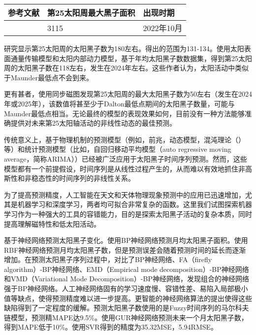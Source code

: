 \begin{table}[!htbp]
\begin{tabular}{lll}
    \hline
    参考文献 & 第25太阳周最大黑子面积 & 出现时期\\
    \hline
    \citep{li2021predicting} &  3115\pm 401 & 2022年10月\\
    \bottomrule
  \end{tabular}
\end{table}

\citet{pesnell2018effects}研究显示第25太阳周的太阳黑子数为180左右。\citet{bisoi2020another}得出的范围为131-134。\citet{bhowmik2018prediction}使用太阳表面通量传输模型和太阳内部动力模型，基于年均太阳黑子数数据集，得到第25太阳周的太阳黑子数在118左右，发生在2024年左右。这些作者认为，太阳活动中类似于Maunder最低点不会到来。

更有甚者，\citep{kitiashvili2020application}使用同步磁图发现第25太阳周的最大太阳黑子数为50左右（发生在2024年或2025年），该数值将甚至少于Dalton最低点期间的太阳黑子数量，可能与Maunder最低点相当。无论最终的模型的表现效果如何，目前没有一种方法能够准确提供对未来第25太阳轴活动的非线性动态的最佳预测。

传统意义上，基于物理机制的预测模型（例如，前兆，动态模型，混沌理论（\citep{jie2012prediction}）等）和统计预测模型（比如，自回归移动平均模型（auto regressive moving average，简称ARIMA））已经被广泛应用于太阳黑子时间序列预测。然而，这些模型都有一个前提假设，时间序列是从线性过程产生的，从而难以有效地抓住非高斯性和非稳态性的时间序列的非线性关系\citep{jiang2011sunspot,arlt2015solar}。

为了提高预测精度，人工智能在天文和天体物理现象预测中的应用已迅速增加\citep{pala2019forecasting,fluke2020surveying}，尤其是机器学习和深度学习，两者均可拟合非常复杂的函数。这里我们试图探索机器学习作为一种强大的工具的容错能力，目的是探索太阳黑子活动的复杂本质，同时提高理解磁特性和低太阳活动。

\citet{ren2014neural}基于神经网络预测太阳黑子变化。\citet{ding2012prediction}使用BP神经网络预测月均太阳黑子面积。\citet{zhao2008prediction}使用RBF神经网络预测月均太阳黑子数，但是预测误差会随着预测时间的延长而逐渐增加。\citet{li2018hybrid}在预测太阳黑子序列过程中，对比了BP神经网络、FA（firefly algorithm）-BP神经网络、EMD（Empirical mode decomposition）-BP神经网络和VMD（Variational Mode Decomposition）-BP神经网络，发现组合的神经网络强于BP神经网络。人工神经网络固有的学习速度慢、容错性差、易陷入局部极小值等缺点，使得预测精度难以进一步提高。更智能的神经网络算法的提出使得这些缺陷得到了一定程度的缓解。\citet{novitasari2019flare}预测太阳黑子数使用的是Fuzzy时间序列的马尔科夫链模型，预测精MAPE达9.5\%。\citet{arfianti15sunspot}使用GUR神经网络预测未来一个月太阳黑子数，得到MAPE低于10\%。\citet{suwanto2019prediksi}使用SVR得到的精度为35.32MSE，5.94RMSE。

